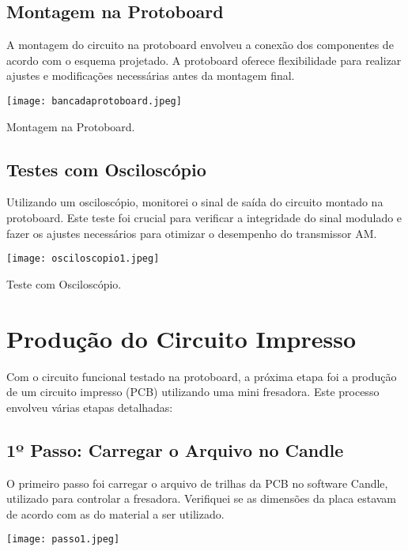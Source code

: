 \documentclass[
]{book}
\begin{document}
\subsection{Montagem na Protoboard}\label{montagem-na-protoboard}

A montagem do circuito na protoboard envolveu a conexão dos componentes de acordo com o esquema projetado. A protoboard oferece flexibilidade para realizar ajustes e modificações necessárias antes da montagem final.

\texttt{[image: bancadaprotoboard.jpeg]}

Montagem na Protoboard.

\subsection{Testes com Osciloscópio}\label{testes-com-osciloscuxf3pio}

Utilizando um osciloscópio, monitorei o sinal de saída do circuito montado na protoboard. Este teste foi crucial para verificar a integridade do sinal modulado e fazer os ajustes necessários para otimizar o desempenho do transmissor AM.

\texttt{[image: osciloscopio1.jpeg]}

Teste com Osciloscópio.

\section{Produção do Circuito Impresso}\label{produuxe7uxe3o-do-circuito-impresso}

Com o circuito funcional testado na protoboard, a próxima etapa foi a produção de um circuito impresso (PCB) utilizando uma mini fresadora. Este processo envolveu várias etapas detalhadas:

\subsection{1º Passo: Carregar o Arquivo no Candle}\label{uxba-passo-carregar-o-arquivo-no-candle}

O primeiro passo foi carregar o arquivo de trilhas da PCB no software Candle, utilizado para controlar a fresadora. Verifiquei se as dimensões da placa estavam de acordo com as do material a ser utilizado.

\texttt{[image: passo1.jpeg]}
\end{document}

